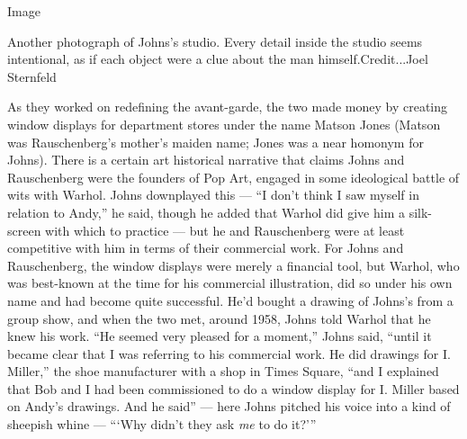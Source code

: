 Image

Another photograph of Johns's studio. Every detail inside the studio
seems intentional, as if each object were a clue about the man
himself.Credit...Joel Sternfeld

As they worked on redefining the avant-garde, the two made money by
creating window displays for department stores under the name Matson
Jones (Matson was Rauschenberg's mother's maiden name; Jones was a near
homonym for Johns). There is a certain art historical narrative that
claims Johns and Rauschenberg were the founders of Pop Art, engaged in
some ideological battle of wits with Warhol. Johns downplayed this ---
``I don't think I saw myself in relation to Andy,'' he said, though he
added that Warhol did give him a silk-screen with which to practice ---
but he and Rauschenberg were at least competitive with him in terms of
their commercial work. For Johns and Rauschenberg, the window displays
were merely a financial tool, but Warhol, who was best-known at the time
for his commercial illustration, did so under his own name and had
become quite successful. He'd bought a drawing of Johns's from a group
show, and when the two met, around 1958, Johns told Warhol that he knew
his work. ``He seemed very pleased for a moment,'' Johns said, ``until
it became clear that I was referring to his commercial work. He did
drawings for I. Miller,'' the shoe manufacturer with a shop in Times
Square, ``and I explained that Bob and I had been commissioned to do a
window display for I. Miller based on Andy's drawings. And he said'' ---
here Johns pitched his voice into a kind of sheepish whine --- ```Why
didn't they ask \emph{me} to do it?'''

